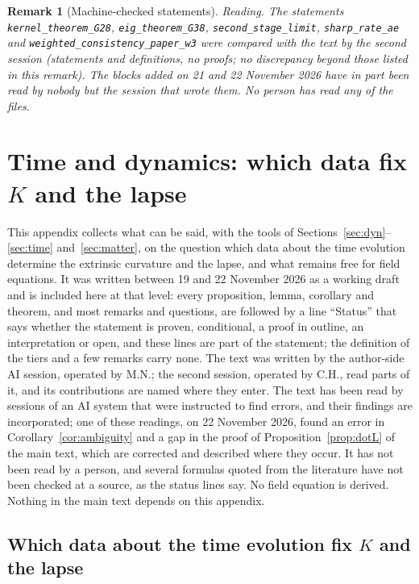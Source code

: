 \documentclass[11pt,a4paper]{article}
\theoremstyle{stmt}
\theoremstyle{defn}
\theoremstyle{rmk}
\newtheorem{remark}[theorem]{Remark}
\numberwithin{equation}{section}
\begin{document}
{\begin{remark}[Machine-checked statements]
\emph{Reading.} The statements \texttt{kernel\_theorem\_G28}, \texttt{eig\_theorem\_G38}, \texttt{second\_stage\_limit}, \texttt{sharp\_rate\_ae} and \texttt{weighted\_consistency\_paper\_w3} were compared with the text by the second session (statements and definitions, no proofs; no discrepancy beyond those listed in this remark). The blocks added on 21 and 22 November 2026 have in part been read by nobody but the session that wrote them. No person has read any of the files.

\end{remark}


\section{Time and dynamics: which data fix $K$ and the lapse}\label{app:time}

This appendix collects what can be said, with the tools of Sections~\ref{sec:dyn}--\ref{sec:time} and~\ref{sec:matter}, on the question which data about the time evolution determine the extrinsic curvature and the lapse, and what remains free for field equations. It was written between 19 and 22 November 2026 as a working draft and is included here at that level: every proposition, lemma, corollary and theorem, and most remarks and questions, are followed by a line ``Status'' that says whether the statement is proven, conditional, a proof in outline, an interpretation or open, and these lines are part of the statement; the definition of the tiers and a few remarks carry none. The text was written by the author-side AI session, operated by M.N.; the second session, operated by C.H., read parts of it, and its contributions are named where they enter. The text has been read by sessions of an AI system that were instructed to find errors, and their findings are incorporated; one of these readings, on 22 November 2026, found an error in Corollary~\ref{cor:ambiguity} and a gap in the proof of Proposition~\ref{prop:dotL} of the main text, which are corrected and described where they occur. It has not been read by a person, and several formulas quoted from the literature have not been checked at a source, as the status lines say. No field equation is derived. Nothing in the main text depends on this appendix.

\subsection{Which data about the time evolution fix $K$ and the lapse}\label{sec:t-data}

}
\end{document}
